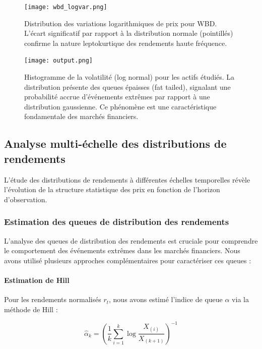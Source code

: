 \documentclass[10pt,a4paper]{article}
\theoremstyle{definition}
\theoremstyle{remark}
\begin{document}
\begin{itemize}
\begin{figure}[h!]
    \centering
    \texttt{[image: wbd\_logvar.png]}
    \caption{Distribution des variations logarithmiques de prix pour WBD. L'écart significatif par rapport à la distribution normale (pointillés) confirme la nature leptokurtique des rendements haute fréquence.}
    \label{fig:log_variations_wbd}
\end{figure}

\begin{figure}[h!]
    \centering
    \texttt{[image: output.png]}
    \caption{Histogramme de la volatilité (log normal) pour les actifs étudiés. La distribution présente des queues épaisses (fat tailed), signalant une probabilité accrue d'événements extrêmes par rapport à une distribution gaussienne. Ce phénomène est une caractéristique fondamentale des marchés financiers.}
    \label{fig:volatility_hist}
\end{figure}

\subsection{Analyse multi-échelle des distributions de rendements}

L'étude des distributions de rendements à différentes échelles temporelles révèle l'évolution de la structure statistique des prix en fonction de l'horizon d'observation.

\subsubsection{Estimation des queues de distribution des rendements}

L'analyse des queues de distribution des rendements est cruciale pour comprendre le comportement des événements extrêmes dans les marchés financiers. Nous avons utilisé plusieurs approches complémentaires pour caractériser ces queues :

\paragraph{Estimation de Hill}
Pour les rendements normalisés $r_t$, nous avons estimé l'indice de queue $\alpha$ via la méthode de Hill :

\begin{equation}
\hat{\alpha}_k = \left(\frac{1}{k} \sum_{i=1}^k \log \frac{X_{(i)}}{X_{(k+1)}}\right)^{-1}
\end{equation}


\end{itemize}
\end{document}
